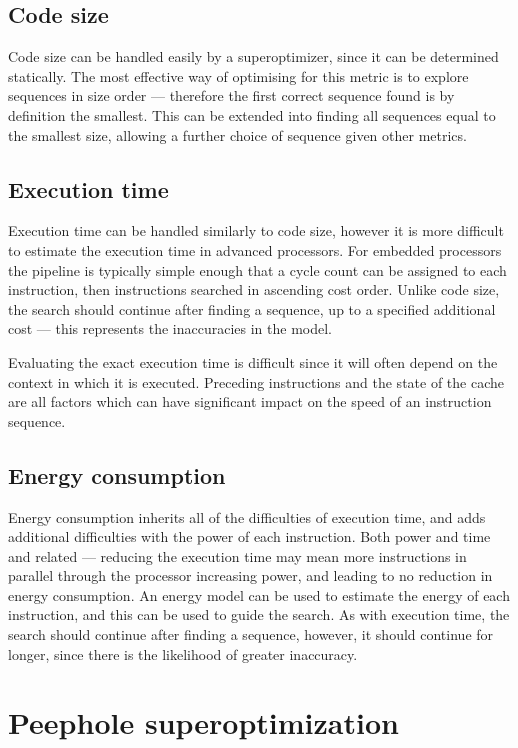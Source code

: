 \documentclass{article}
\begin{document}
\subsection{Code size}
Code size can be handled easily by a superoptimizer, since it can be determined statically. The most effective way of optimising for this metric is to explore sequences in size order --- therefore the first correct sequence found is by definition the smallest. This can be extended into finding all sequences equal to the smallest size, allowing a further choice of sequence given other metrics.

\subsection{Execution time}

Execution time can be handled similarly to code size, however it is more difficult to estimate the execution time in advanced processors. For embedded processors the pipeline is typically simple enough that a cycle count can be assigned to each instruction, then instructions searched in ascending cost order. Unlike code size, the search should continue after finding a sequence, up to a specified additional cost --- this represents the inaccuracies in the model.

Evaluating the exact execution time is difficult since it will often depend on the context in which it is executed. Preceding instructions and the state of the cache are all factors which can have significant impact on the speed of an instruction sequence.

\subsection{Energy consumption}
Energy consumption inherits all of the difficulties of execution time, and adds additional difficulties with the power of each instruction. Both power and time and related --- reducing the execution time may mean more instructions in parallel through the processor increasing power, and leading to no reduction in energy consumption. An energy model can be used to estimate the energy of each instruction, and this can be used to guide the search. As with execution time, the search should continue after finding a sequence, however, it should continue for longer, since there is the likelihood of greater inaccuracy.

\section{Peephole superoptimization}
\end{document}
